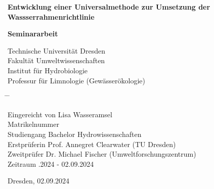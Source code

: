 \documentclass[ngerman,11pt,a4paper]{article}
\begin{document}
	\thispagestyle{empty}

	\begin{center}

		\vspace*{1cm}

		\textbf{\huge{Entwicklung einer Universalmethode zur Umsetzung der Wassserrahmenrichtlinie}}

		\vspace{2cm}

		\textbf{\Large{Seminararbeit}}

		\vspace{2cm}

		Technische Universität Dresden\\
		Fakultät Umweltwissenschaften\\
		Institut für Hydrobiologie\\
		Professur für Limnologie (Gewässerökologie)

	\end{center}

	\vspace{4cm}

	\begin{tabbing}
		\hspace{1cm} \= \hspace{4cm} \= \kill

		\> Eingereicht von \> Lisa Wasseramsel\\

    \> Matrikelnummer \\

    \> Studiengang \> Bachelor Hydrowissenschaften\\

		\> Erstprüferin \> Prof. Annegret Clearwater (TU Dresden)\\

		\> Zweitprüfer \> Dr. Michael Fischer (Umweltforschungszentrum)\\

		\> Zeitraum .2024 - 02.09.2024

	\end{tabbing}


	\vspace{4cm}


Dresden, 02.09.2024

\pagebreak


\end{document}
